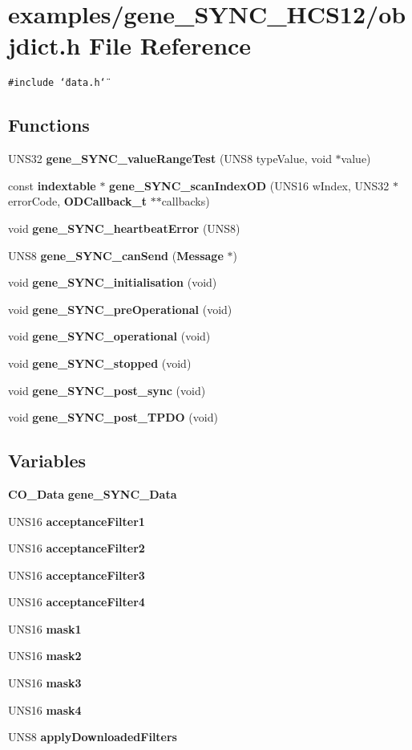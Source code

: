 \section{examples/gene\_\-SYNC\_\-HCS12/objdict.h File Reference}
\label{objdict_8h}
{\tt \#include \char`\"{}data.h\char`\"{}}\par
\subsection*{Functions}
\begin{CompactItemize}
\item 
UNS32 {\bf gene\_\-SYNC\_\-value\-Range\-Test} (UNS8 type\-Value, void $\ast$value)
\item 
const {\bf indextable} $\ast$ {\bf gene\_\-SYNC\_\-scan\-Index\-OD} (UNS16 w\-Index, UNS32 $\ast$error\-Code, {\bf ODCallback\_\-t} $\ast$$\ast$callbacks)
\item 
void {\bf gene\_\-SYNC\_\-heartbeat\-Error} (UNS8)
\item 
UNS8 {\bf gene\_\-SYNC\_\-can\-Send} ({\bf Message} $\ast$)
\item 
void {\bf gene\_\-SYNC\_\-initialisation} (void)
\item 
void {\bf gene\_\-SYNC\_\-pre\-Operational} (void)
\item 
void {\bf gene\_\-SYNC\_\-operational} (void)
\item 
void {\bf gene\_\-SYNC\_\-stopped} (void)
\item 
void {\bf gene\_\-SYNC\_\-post\_\-sync} (void)
\item 
void {\bf gene\_\-SYNC\_\-post\_\-TPDO} (void)
\end{CompactItemize}
\subsection*{Variables}
\begin{CompactItemize}
\item 
{\bf CO\_\-Data} {\bf gene\_\-SYNC\_\-Data}
\item 
UNS16 {\bf acceptance\-Filter1}
\item 
UNS16 {\bf acceptance\-Filter2}
\item 
UNS16 {\bf acceptance\-Filter3}
\item 
UNS16 {\bf acceptance\-Filter4}
\item 
UNS16 {\bf mask1}
\item 
UNS16 {\bf mask2}
\item 
UNS16 {\bf mask3}
\item 
UNS16 {\bf mask4}
\item 
UNS8 {\bf apply\-Downloaded\-Filters}
\end{CompactItemize}


